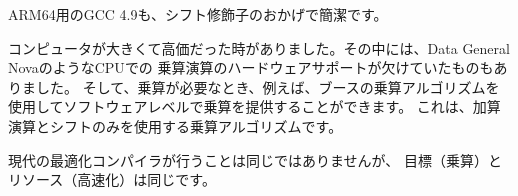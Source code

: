 



ARM64用のGCC 4.9も、シフト修飾子のおかげで簡潔です。





コンピュータが大きくて高価だった時がありました。その中には、Data General Novaのような\ac{CPU}での
乗算演算のハードウェアサポートが欠けていたものもありました。 
そして、乗算が必要なとき、例えば、ブースの乗算アルゴリズムを使用してソフトウェアレベルで乗算を提供することができます。
これは、加算演算とシフトのみを使用する乗算アルゴリズムです。

現代の最適化コンパイラが行うことは同じではありませんが、
目標（乗算）とリソース（高速化）は同じです。
